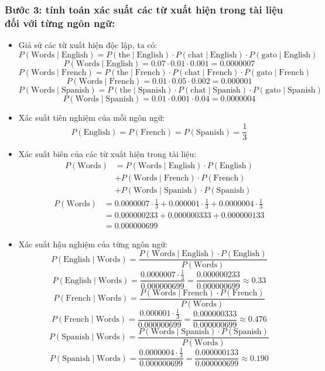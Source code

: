 \begin{itemize}
        \subsubsection{ Bước 3: tính toán xác suất các từ xuất hiện trong tài liệu đối với từng ngôn ngữ:}
        \begin{itemize}
            \item Giả sử các từ xuất hiện độc lập, ta có:
        \[P(\text{Words} \mid \text{English}) = P(\text{the} \mid \text{English}) \cdot P(\text{chat} \mid \text{English}) \cdot P(\text{gato} \mid \text{English})\]
        \[P(\text{Words} \mid \text{English}) = 0.07 \cdot 0.01 \cdot 0.001 = 0.0000007 \]
        \[P(\text{Words} \mid \text{French}) = P(\text{the} \mid \text{French}) \cdot P(\text{chat} \mid \text{French}) \cdot P(\text{gato} \mid \text{French})\]
        \[ P(\text{Words} \mid \text{French}) = 0.01 \cdot 0.05 \cdot 0.002 = 0.000001 \]
        \[P(\text{Words} \mid \text{Spanish}) = P(\text{the} \mid \text{Spanish}) \cdot P(\text{chat} \mid \text{Spanish}) \cdot P(\text{gato} \mid \text{Spanish})\]
        \[P(\text{Words} \mid \text{Spanish}) = 0.01 \cdot 0.001 \cdot 0.04 = 0.0000004\]
            \item Xác suất tiên nghiệm của mỗi ngôn ngữ:
        \[P(\text{English}) = P(\text{French}) = P(\text{Spanish}) = \frac{1}{3}\]
            \item Xác suất biên của các từ xuất hiện trong tài liệu:
    \begin{align*}
        P(\text{Words}) &= P(\text{Words} \mid \text{English}) \cdot P(\text{English}) \\
        &+ P(\text{Words} \mid \text{French}) \cdot P(\text{French}) \\
        &+ P(\text{Words} \mid \text{Spanish}) \cdot P(\text{Spanish})
    \end{align*}
    \begin{align*}
        P(\text{Words}) &= 0.0000007 \cdot \frac{1}{3} + 0.000001 \cdot \frac{1}{3} + 0.0000004 \cdot \frac{1}{3} \\
        &= 0.000000233 + 0.000000333 + 0.000000133 \\
        &= 0.000000699
    \end{align*}
            \item Xác suất hậu nghiệm của từng ngôn ngữ: 
        \[P(\text{English} \mid \text{Words}) = \frac{P(\text{Words} \mid \text{English}) \cdot P(\text{English})}{P(\text{Words})} \]
        \[P(\text{English} \mid \text{Words}) = \frac{0.0000007 \cdot \frac{1}{3}}{0.000000699} = \frac{0.000000233}{0.000000699} \approx 0.33\]
        \[P(\text{French} \mid \text{Words}) = \frac{P(\text{Words} \mid \text{French}) \cdot P(\text{French})}{P(\text{Words})}\]
        \[P(\text{French} \mid \text{Words}) = \frac{0.000001 \cdot \frac{1}{3}}{0.000000699} = \frac{0.000000333}{0.000000699} \approx 0.476\] 
        \[P(\text{Spanish} \mid \text{Words}) = \frac{P(\text{Words} \mid \text{Spanish}) \cdot P(\text{Spanish})}{P(\text{Words})} \]
        \[P(\text{Spanish} \mid \text{Words}) = \frac{0.0000004 \cdot \frac{1}{3}}{0.000000699} = \frac{0.000000133}{0.000000699} \approx 0.190 \]
        \end{itemize}

\end{itemize}
